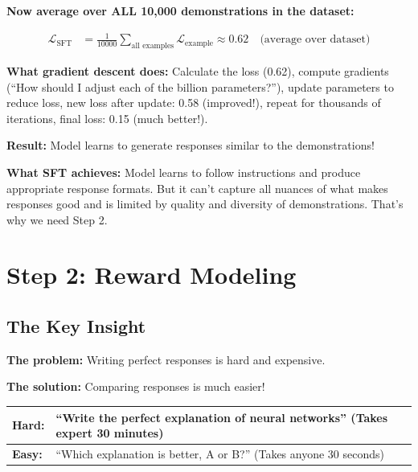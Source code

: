 \begin{chapterenv}
\textbf{Now average over ALL 10,000 demonstrations in the dataset:}

\begin{align*}
\mathcal{L}_{\text{SFT}} &= \frac{1}{10000} \sum_{\text{all examples}} \mathcal{L}_{\text{example}} \approx 0.62 \quad \text{(average over dataset)}
\end{align*}

\begin{infobox}
\textbf{What gradient descent does:} Calculate the loss (0.62), compute gradients (``How should I adjust each of the billion parameters?''), update parameters to reduce loss, new loss after update: 0.58 (improved!), repeat for thousands of iterations, final loss: 0.15 (much better!).

\textbf{Result:} Model learns to generate responses similar to the demonstrations!
\end{infobox}

\begin{tipbox}
\textbf{What SFT achieves:} Model learns to follow instructions and produce appropriate response formats. But it can't capture all nuances of what makes responses good and is limited by quality and diversity of demonstrations. That's why we need Step 2.
\end{tipbox}

\section{Step 2: Reward Modeling}

\subsection{The Key Insight}

\textbf{The problem:} Writing perfect responses is hard and expensive.

\textbf{The solution:} Comparing responses is much easier!

\begin{center}
\begin{tabular}{p{}p{}}
\toprule
\textbf{Hard:} & ``Write the perfect explanation of neural networks'' (Takes expert 30 minutes) \\
\midrule
\textbf{Easy:} & ``Which explanation is better, A or B?'' (Takes anyone 30 seconds) \\
\bottomrule
\end{tabular}
\end{center}


\end{chapterenv}
